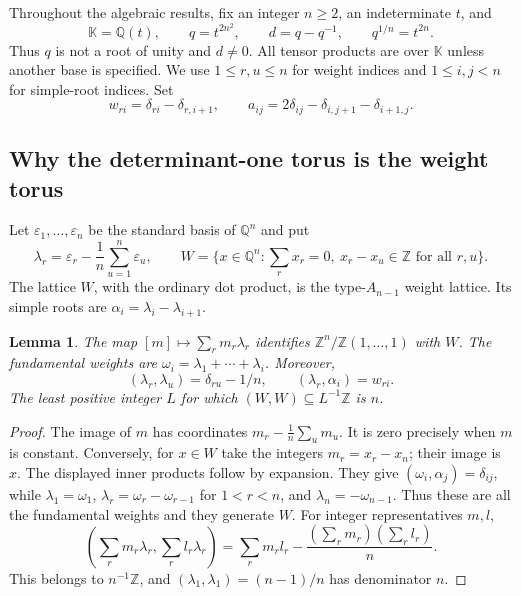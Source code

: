 \documentclass[11pt]{article}
\newtheorem{lemma}[theorem]{Lemma}
\theoremstyle{definition}
\theoremstyle{remark}
\newcommand{\kk}{\mathbb{K}}
\newcommand{\Z}{\mathbb{Z}}
\newcommand{\Q}{\mathbb{Q}}
\newcommand{\eps}{\varepsilon}
\begin{document}
Throughout the algebraic results, fix an integer $n\geq2$, an indeterminate $t$, and
\begin{equation}\label{eq:base}
 \kk=\Q(t),\qquad q=t^{2n^2},\qquad d=q-q^{-1},\qquad q^{1/n}=t^{2n}.
\end{equation}
Thus $q$ is not a root of unity and $d\ne0$. All tensor products are over $\kk$ unless another base is specified. We use $1\leq r,u\leq n$ for weight indices and $1\leq i,j<n$ for simple-root indices. Set
\[
 w_{ri}=\delta_{ri}-\delta_{r,i+1},\qquad
 a_{ij}=2\delta_{ij}-\delta_{i,j+1}-\delta_{i+1,j}.
\]

\subsection{Why the determinant-one torus is the weight torus}
Let $\eps_1,\ldots,\eps_n$ be the standard basis of $\Q^n$ and put
\[
 \lambda_r=\eps_r-\frac1n\sum_{u=1}^n\eps_u,\qquad
 W=\{x\in\Q^n:\textstyle\sum_r x_r=0,\ x_r-x_u\in\Z\text{ for all }r,u\}.
\]
The lattice $W$, with the ordinary dot product, is the type-$A_{n-1}$ weight lattice. Its simple roots are $\alpha_i=\lambda_i-\lambda_{i+1}$.

\begin{lemma}\label{lem:lattice}
The map $[m]\mapsto\sum_r m_r\lambda_r$ identifies $\Z^n/\Z(1,\ldots,1)$ with $W$. The fundamental weights are $\omega_i=\lambda_1+\cdots+\lambda_i$. Moreover,
\[
 (\lambda_r,\lambda_u)=\delta_{ru}-1/n,\qquad
 (\lambda_r,\alpha_i)=w_{ri}.
\]
The least positive integer $L$ for which $(W,W)\subseteq L^{-1}\Z$ is $n$.
\end{lemma}
\begin{proof}
The image of $m$ has coordinates $m_r-\frac1n\sum_u m_u$. It is zero precisely when $m$ is constant. Conversely, for $x\in W$ take the integers $m_r=x_r-x_n$; their image is $x$. The displayed inner products follow by expansion. They give $(\omega_i,\alpha_j)=\delta_{ij}$, while
$\lambda_1=\omega_1$, $\lambda_r=\omega_r-\omega_{r-1}$ for $1<r<n$, and $\lambda_n=-\omega_{n-1}$. Thus these are all the fundamental weights and they generate $W$. For integer representatives $m,l$,
\[
 \left(\sum_r m_r\lambda_r,\sum_r l_r\lambda_r\right)
 =\sum_r m_rl_r-\frac{(\sum_r m_r)(\sum_r l_r)}n.
\]
This belongs to $n^{-1}\Z$, and $(\lambda_1,\lambda_1)=(n-1)/n$ has denominator $n$.
\end{proof}
\end{document}
